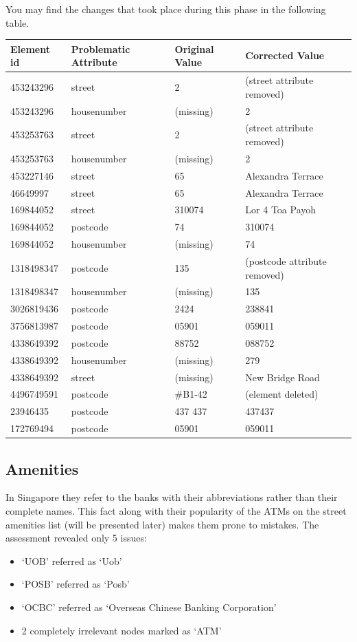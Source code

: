 \documentclass[11pt]{article}
\begin{document}
    You may find the changes that took place during this phase in the
following table.

\newpage

\begin{longtable}[c]{@{}llll@{}}
\toprule
Element id & Problematic Attribute & Original Value & Corrected
Value\tabularnewline
\midrule
\endhead
453243296 & street & 2 & (street attribute removed)\tabularnewline
453243296 & housenumber & (missing) & 2\tabularnewline
453253763 & street & 2 & (street attribute removed)\tabularnewline
453253763 & housenumber & (missing) & 2\tabularnewline
453227146 & street & 65 & Alexandra Terrace\tabularnewline
46649997 & street & 65 & Alexandra Terrace\tabularnewline
169844052 & street & 310074 & Lor 4 Toa Payoh\tabularnewline
169844052 & postcode & 74 & 310074\tabularnewline
169844052 & housenumber & (missing) & 74\tabularnewline
1318498347 & postcode & 135 & (postcode attribute
removed)\tabularnewline
1318498347 & housenumber & (missing) & 135\tabularnewline
3026819436 & postcode & 2424 & 238841\tabularnewline
3756813987 & postcode & 05901 & 059011\tabularnewline
4338649392 & postcode & 88752 & 088752\tabularnewline
4338649392 & housenumber & (missing) & 279\tabularnewline
4338649392 & street & (missing) & New Bridge Road\tabularnewline
4496749591 & postcode & \#B1-42 & (element deleted)\tabularnewline
23946435 & postcode & 437 437 & 437437\tabularnewline
172769494 & postcode & 05901 & 059011\tabularnewline
\bottomrule
\end{longtable}

    \subsection*{Amenities}\label{amenities}

    In Singapore they refer to the banks with their abbreviations rather
than their complete names. This fact along with their popularity of the
ATMs on the street amenities list (will be presented later) makes them
prone to mistakes. The assessment revealed only 5 issues:
\begin{itemize}
 \item `UOB' referred as `Uob'
\end{itemize}
\begin{itemize}
 \item `POSB' referred as `Posb'
\end{itemize}
\begin{itemize}
 \item `OCBC' referred as `Overseas Chinese Banking Corporation'
\end{itemize}
\begin{itemize}
 \item 2 completely irrelevant nodes marked as `ATM'
\end{itemize}
\end{document}

